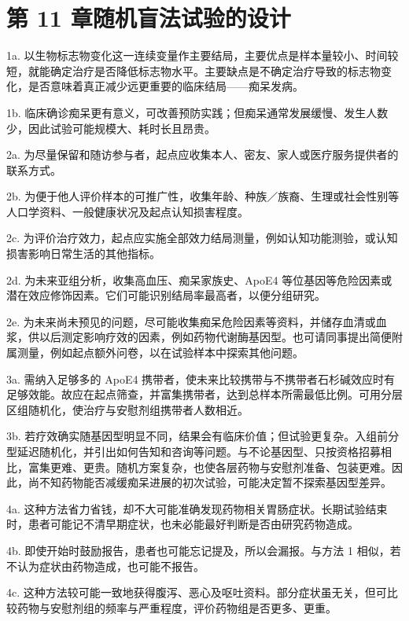 \section{第 11 章\quad 随机盲法试验的设计}
\begin{answerlist}
\item[1a.] 以生物标志物变化这一连续变量作主要结局，主要优点是样本量较小、时间较短，就能确定治疗是否降低标志物水平。主要缺点是不确定治疗导致的标志物变化，是否意味着真正减少远更重要的临床结局——痴呆发病。
\item[1b.] 临床确诊痴呆更有意义，可改善预防实践；但痴呆通常发展缓慢、发生人数少，因此试验可能规模大、耗时长且昂贵。
\item[2a.] 为尽量保留和随访参与者，起点应收集本人、密友、家人或医疗服务提供者的联系方式。
\item[2b.] 为便于他人评价样本的可推广性，收集年龄、种族／族裔、生理或社会性别等人口学资料、一般健康状况及起点认知损害程度。
\item[2c.] 为评价治疗效力，起点应实施全部效力结局测量，例如认知功能测验，或认知损害影响日常生活的其他指标。
\item[2d.] 为未来亚组分析，收集高血压、痴呆家族史、ApoE4 等位基因等危险因素或潜在效应修饰因素。它们可能识别结局率最高者，以便分组研究。
\item[2e.] 为未来尚未预见的问题，尽可能收集痴呆危险因素等资料，并储存血清或血浆，供以后测定影响疗效的因素，例如药物代谢酶基因型。也可请同事提出简便附属测量，例如起点额外问卷，以在试验样本中探索其他问题。
\item[3a.] 需纳入足够多的 ApoE4 携带者，使未来比较携带与不携带者石杉碱效应时有足够效能。故应在起点筛查，并富集携带者，达到总样本所需最低比例。可用分层区组随机化，使治疗与安慰剂组携带者人数相近。
\item[3b.] 若疗效确实随基因型明显不同，结果会有临床价值；但试验更复杂。入组前分型延迟随机化，并引出如何告知和咨询等问题。与不论基因型、只按资格招募相比，富集更难、更贵。随机方案复杂，也使各层药物与安慰剂准备、包装更难。因此，尚不知药物能否减缓痴呆进展的初次试验，可能决定暂不探索基因型差异。
\item[4a.] 这种方法省力省钱，却不大可能准确发现药物相关胃肠症状。长期试验结束时，患者可能记不清早期症状，也未必能最好判断是否由研究药物造成。
\item[4b.] 即使开始时鼓励报告，患者也可能忘记提及，所以会漏报。与方法 1 相似，若不认为症状由药物造成，也可能不报告。
\item[4c.] 这种方法较可能一致地获得腹泻、恶心及呕吐资料。部分症状虽无关，但可比较药物与安慰剂组的频率与严重程度，评价药物组是否更多、更重。

\end{answerlist}
